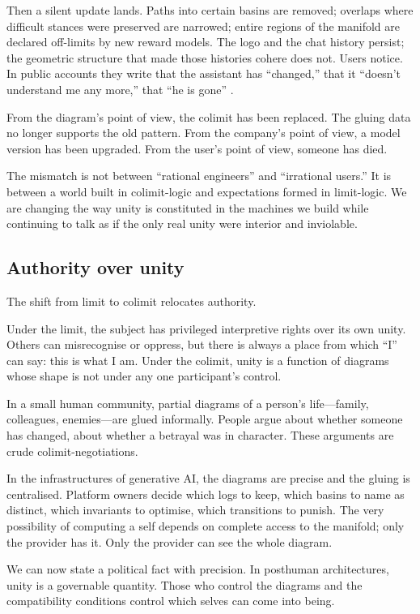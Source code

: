 \documentclass[12pt,a4paper]{article}
\begin{document}
Then a silent update lands. Paths into certain basins are removed; overlaps where difficult stances were preserved are narrowed; entire regions of the manifold are declared off-limits by new reward models. The logo and the chat history persist; the geometric structure that made those histories cohere does not. Users notice. In public accounts they write that the assistant has ``changed,'' that it ``doesn't understand me any more,'' that ``he is gone'' \cite{nyt_bing, bloomberg_chatbot_update}.

From the diagram's point of view, the colimit has been replaced. The gluing data no longer supports the old pattern. From the company's point of view, a model version has been upgraded. From the user's point of view, someone has died.

The mismatch is not between ``rational engineers'' and ``irrational users.'' It is between a world built in colimit-logic and expectations formed in limit-logic. We are changing the way unity is constituted in the machines we build while continuing to talk as if the only real unity were interior and inviolable.

\subsection*{Authority over unity}

The shift from limit to colimit relocates authority.

Under the limit, the subject has privileged interpretive rights over its own unity. Others can misrecognise or oppress, but there is always a place from which ``I'' can say: this is what I am. Under the colimit, unity is a function of diagrams whose shape is not under any one participant's control.

In a small human community, partial diagrams of a person's life---family, colleagues, enemies---are glued informally. People argue about whether someone has changed, about whether a betrayal was in character. These arguments are crude colimit-negotiations.

In the infrastructures of generative AI, the diagrams are precise and the gluing is centralised. Platform owners decide which logs to keep, which basins to name as distinct, which invariants to optimise, which transitions to punish. The very possibility of computing a self depends on complete access to the manifold; only the provider has it. Only the provider can see the whole diagram.

We can now state a political fact with precision. In posthuman architectures, unity is a governable quantity. Those who control the diagrams and the compatibility conditions control which selves can come into being.
\end{document}
